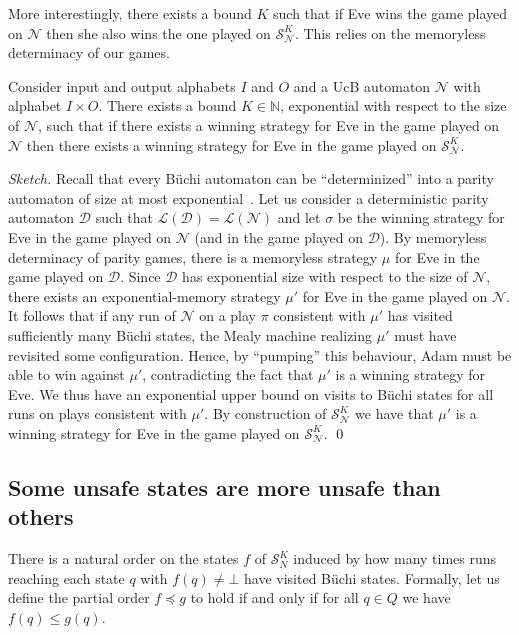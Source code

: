 \documentclass[runningheads,a4paper,draft]{llncs}
\newcommand{\eve}{Eve\xspace}
\newcommand{\adam}{Adam\xspace}
\newcommand{\calN}{\mathcal{N}}
\newcommand{\calS}{\mathcal{S}}
\newcommand{\calD}{\mathcal{D}}
\renewcommand{\lang}[1]{\mathcal{L}({#1})}
\begin{document}
More interestingly, there exists a bound $K$ such that if \eve wins
the game played on $\calN$ then she also wins the one played on
$\calS^K_\calN$.  This relies on the memoryless determinacy of our games.
%
\begin{lemma}\label{lem:converse}
    Consider input and output alphabets $I$ and $O$ and a UcB automaton
    $\calN$ with alphabet $I \times O$. There exists a bound $K \in
    \mathbb{N}$, exponential with respect to the size of $\calN$, such that if
    there exists a winning strategy for \eve in the game played on $\calN$
    then there exists a winning strategy for \eve in the game played on
    $\calS^K_\calN$.
\end{lemma}
\begin{proof}[Sketch]
  Recall that every B\"uchi automaton can be ``determinized'' into a parity
  automaton of size at most exponential~\cite{safra88,piterman07}.  Let us
  consider a deterministic parity automaton $\calD$ such that
  $\lang{\calD} = \lang{\calN}$ and let $\sigma$ be the winning strategy for \eve in
  the game played on $\calN$ (and in the game played on $\calD$). By memoryless
  determinacy of parity games, there is a memoryless strategy $\mu$ for \eve in
  the game played on $\calD$. Since $\calD$ has exponential size with respect to
  the size of $\calN$, there exists an exponential-memory strategy $\mu'$ for \eve
  in the game played on $\calN$. It follows that if any run of $\calN$ on a play
  $\pi$ consistent with $\mu'$ has visited sufficiently many B\"uchi states, the
  Mealy machine realizing $\mu'$ must have revisited some configuration. Hence, by
  ``pumping'' this behaviour, \adam must be able to win against $\mu'$,
  contradicting the fact that $\mu'$ is a winning strategy for \eve. We thus have
  an exponential upper bound on visits to B\"uchi states for all runs on plays
  consistent with $\mu'$. By construction of $\calS^K_\calN$ we have that $\mu'$ is
  a winning strategy for \eve in the game played on $\calS^K_\calN$.  \qed
\end{proof}

\subsection{Some unsafe states are more unsafe than others}\label{sec:order}
There is a natural order on the states $f$ of $\calS^K_N$ induced by how many
times runs reaching each state $q$ with $f(q) \neq \bot$ have visited
B\"uchi states. Formally, let us define the partial order $f \preceq g$
to hold if and only if for all $q \in Q$ we have $f(q) \leq g(q)$.
\end{document}
